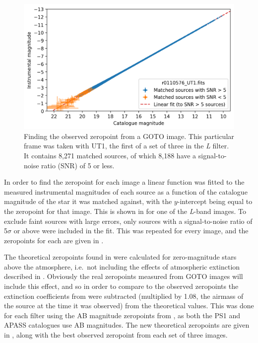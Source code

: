 \begin{colsection}
\begin{colsection}
\begin{figure}[t]
    \begin{center}
        \includegraphics[width=\textwidth]{images/throughput/zeropoint_real.png}
    \end{center}
    \caption[Finding the observed zeropoint from a GOTO image]{
        Finding the observed zeropoint from a GOTO image. This particular frame was taken with UT1, the first of a set of three in the \textit{L} filter. It contains 8,271 matched sources, of which 8,188 have a signal-to-noise ratio (SNR) of 5 or less.
    }\label{fig:zeropoint}
\end{figure}

In order to find the zeropoint for each image a linear function was fitted to the measured instrumental magnitudes of each source as a function of the catalogue magnitude of the star it was matched against, with the $y$-intercept being equal to the zeropoint for that image. This is shown in  for one of the \textit{L}-band images. To exclude faint sources with large errors, only sources with a signal-to-noise ratio of 5$\sigma$ or above were included in the fit. This was repeated for every image, and the zeropoints for each are given in .

The theoretical zeropoints found in  were calculated for zero-magnitude stars above the atmosphere, i.e.\ not including the effects of atmospheric extinction described in . Obviously the real zeropoints measured from GOTO images will include this effect, and so in order to compare to the observed zeropoints the extinction coefficients from  were subtracted (multiplied by 1.08, the airmass of the source at the time it was observed) from the theoretical values. This was done for each filter using the AB magnitude zeropoints from , as both the PS1 and APASS catalogues use AB magnitudes. The new theoretical zeropoints are given in , along with the best observed zeropoint from each set of three images.


\end{colsection}
\end{colsection}
